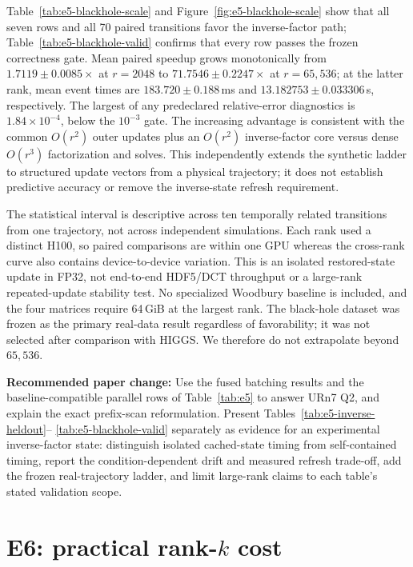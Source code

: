 \documentclass[11pt]{article}
\newcommand{\paperchange}[1]{\textbf{Recommended paper change:} #1}
\begin{document}
Table~\ref{tab:e5-blackhole-scale} and
Figure~\ref{fig:e5-blackhole-scale} show that all seven rows and all 70 paired
transitions favor the inverse-factor path; Table~\ref{tab:e5-blackhole-valid}
confirms that every row passes the frozen correctness gate.  Mean paired
speedup grows monotonically
from \(1.7119\pm0.0085\times\) at \(r=2048\) to
\(71.7546\pm0.2247\times\) at \(r=65{,}536\); at the latter rank, mean event
times are \(183.720\pm0.188\)\,ms and
\(13.182753\pm0.033306\)\,s, respectively.  The largest of any predeclared
relative-error diagnostics is \(1.84\times10^{-4}\), below the \(10^{-3}\)
gate.  The increasing advantage is consistent with the common \(O(r^2)\)
outer updates plus an \(O(r^2)\) inverse-factor core versus dense
\(O(r^3)\) factorization and solves.  This independently extends the
synthetic ladder to structured update vectors from a physical trajectory; it
does not establish predictive accuracy or remove the inverse-state refresh
requirement.

The statistical interval is descriptive across ten temporally related
transitions from one trajectory, not across independent simulations.  Each
rank used a distinct H100, so paired comparisons are within one GPU whereas
the cross-rank curve also contains device-to-device variation.  This is an
isolated restored-state update in FP32, not end-to-end HDF5/DCT throughput or
a large-rank repeated-update stability test.  No specialized Woodbury
baseline is included, and the four matrices require 64\,GiB at the largest
rank.  The black-hole dataset was frozen as the primary real-data result
regardless of favorability; it was not selected after comparison with HIGGS.
We therefore do not extrapolate beyond \(65{,}536\).

\paperchange{Use the fused batching results and the baseline-compatible
parallel rows of Table~\ref{tab:e5} to answer URn7 Q2, and explain the exact
prefix-scan reformulation.  Present Tables~\ref{tab:e5-inverse-heldout}--%
\ref{tab:e5-blackhole-valid} separately as evidence for an experimental
inverse-factor state: distinguish isolated cached-state timing from
self-contained timing, report the condition-dependent drift and measured
refresh trade-off, add the frozen real-trajectory ladder, and limit
large-rank claims to each table's stated validation scope.}

\section{E6: practical \texorpdfstring{rank-\(k\)}{rank-k} cost}
\label{sec:e6}
\end{document}
